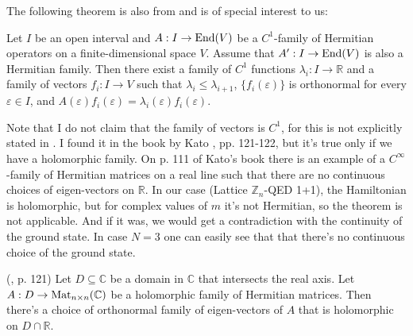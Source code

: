 The following theorem is also from \cite{rellich} and is of special interest to us:
\begin{theorem}\label{thm:pert}
Let $I$ be an open interval and $A : I \rightarrow \operatorname{End}(V)$ be a $C^1$-family of Hermitian operators on a finite-dimensional space $V$. Assume that $A^\prime : I \rightarrow \operatorname{End}(V)$ is also a Hermitian family. Then there exist a family of $C^1$ functions $\lambda_i : I \rightarrow \mathbb R$ and a family of vectors $f_i : I \rightarrow V$ such that $\lambda_i \leq \lambda_{i+1}$, $\{f_i(\varepsilon)\}$ is orthonormal for every $\varepsilon \in I$, and $A(\varepsilon) f_i(\varepsilon) = \lambda_i(\varepsilon)f_i(\varepsilon)$.
\end{theorem}
Note that I do not claim that the family of vectors is $C^1$, for this is not explicitly stated in \cite{rellich}. 
I found it in the book by Kato \cite{kato}, pp. 121-122, but it's true only if we have a holomorphic family. On p. 111 of Kato's book there is an example of a $C^{\infty}$-family of Hermitian matrices on a real line such that there are no continuous choices of eigen-vectors on $\mathbb R$. In our case (Lattice $\mathbb Z_n$-QED 1+1), the Hamiltonian is holomorphic, but for complex values of $m$ it's not Hermitian, so the theorem is not applicable. And if it was, we would get a contradiction with the continuity of the ground state. In case $N=3$ one can easily see that that there's no continuous choice of the ground state.
\begin{theorem} (\cite{kato}, p. 121)
Let $D \subseteq \mathbb C$ be a domain in $\mathbb C$ that intersects the real axis. Let $A : D \rightarrow \operatorname{Mat}_{n\times n}(\mathbb C)$ be a holomorphic family of Hermitian matrices. Then there's a choice of orthonormal family of eigen-vectors of $A$ that is holomorphic on $D \cap \mathbb R$.
\end{theorem}